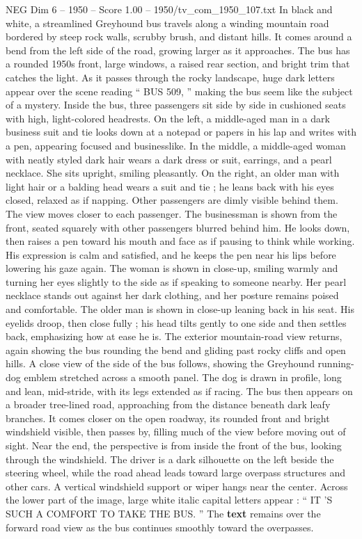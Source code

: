 \begin{textsample}{NEG Dim 6 – 1950 – Score 1.00 – 1950/tv\_com\_1950\_107.txt}  \label{ex:f6_neg_088}
In black and white, a streamlined Greyhound bus travels along a winding mountain road bordered by steep rock walls, scrubby brush, and distant hills.
It comes around a bend from the left side of the road, growing larger as it approaches.
The bus has a rounded 1950s front, large windows, a raised rear section, and bright trim that catches the light.
As it passes through the rocky landscape, huge dark letters appear over the scene reading “ BUS 509, ” making the bus seem like the subject of a mystery.
Inside the bus, three passengers sit side by side in cushioned seats with high, light-colored headrests.
On the left, a middle-aged man in a dark business suit and tie looks down at a notepad or papers in his lap and writes with a pen, appearing focused and businesslike.
In the middle, a middle-aged woman with neatly styled dark hair wears a dark dress or suit, earrings, and a pearl necklace.
She sits upright, smiling pleasantly.
On the right, an older man with light hair or a balding head wears a suit and tie ; he leans back with his eyes closed, relaxed as if napping.
Other passengers are dimly visible behind them.
The view moves closer to each passenger.
The businessman is shown from the front, seated squarely with other passengers blurred behind him.
He looks down, then raises a pen toward his mouth and face as if pausing to think while working.
His expression is calm and satisfied, and he keeps the pen near his lips before lowering his gaze again.
The woman is shown in close-up, smiling warmly and turning her eyes slightly to the side as if speaking to someone nearby.
Her pearl necklace stands out against her dark clothing, and her posture remains poised and comfortable.
The older man is shown in close-up leaning back in his seat.
His eyelids droop, then close fully ; his head tilts gently to one side and then settles back, emphasizing how at ease he is.
The exterior mountain-road view returns, again showing the bus rounding the bend and gliding past rocky cliffs and open hills.
A close view of the side of the bus follows, showing the Greyhound running-dog emblem stretched across a smooth panel.
The dog is drawn in profile, long and lean, mid-stride, with its legs extended as if racing.
The bus then appears on a broader tree-lined road, approaching from the distance beneath dark leafy branches.
It comes closer on the open roadway, its rounded front and bright windshield visible, then passes by, filling much of the view before moving out of sight.
Near the end, the perspective is from inside the front of the bus, looking through the windshield.
The driver is a dark silhouette on the left beside the steering wheel, while the road ahead leads toward large overpass structures and other cars.
A vertical windshield support or wiper hangs near the center.
Across the lower part of the image, large white italic capital letters appear : “ IT ’S SUCH A COMFORT TO TAKE THE BUS. ” The \textbf{text} remains over the forward road view as the bus continues smoothly toward the overpasses.

\end{textsample}

